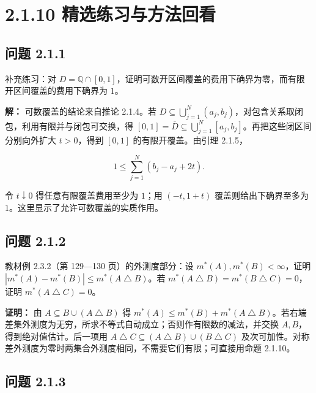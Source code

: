 \documentclass[11pt,a4paper]{article}
\begin{document}
\section[\S{}2.1.10
精选练习与方法回看]{2.1.10
精选练习与方法回看}\label{ux7cbeux9009ux7ec3ux4e60ux4e0eux65b9ux6cd5ux56deux770b}

\subsection{问题 2.1.1}\label{ux95eeux9898-2.1.1}

补充练习：对
\(D=\mathbb Q\cap[0,1]\)，证明可数开区间覆盖的费用下确界为零，而有限开区间覆盖的费用下确界为
\(1\)。

\textbf{解：} 可数覆盖的结论来自推论 2.1.4。若
\(D\subseteq\bigcup_{j=1}^N(a_j,b_j)\)，对包含关系取闭包，利用有限并与闭包可交换，得
\([0,1]=\overline D\subseteq\bigcup_{j=1}^N[a_j,b_j]\)。再把这些闭区间分别向外扩大
\(t>0\)，得到 \([0,1]\) 的有限开覆盖。由引理 2.1.5，

\begin{equation*}
1\le\sum_{j=1}^N(b_j-a_j+2t).
\tag{2.1.23}
\end{equation*}

令 \(t\downarrow0\) 得任意有限覆盖费用至少为 \(1\)；用 \((-t,1+t)\)
覆盖则给出下确界至多为 \(1\)。这里显示了允许可数覆盖的实质作用。

\subsection{问题 2.1.2}\label{ux95eeux9898-2.1.2}

教材例 2.3.2（第 129---130 页）的外测度部分：设
\(m^*(A),m^*(B)<\infty\)，证明
\(|m^*(A)-m^*(B)|\le m^*(A\mathbin{\triangle}B)\)。若
\(m^*(A\mathbin{\triangle}B)=m^*(B\mathbin{\triangle}C)=0\)，证明
\(m^*(A\mathbin{\triangle}C)=0\)。

\textbf{证明：} 由 \(A\subseteq B\cup(A\mathbin{\triangle}B)\) 得
\(m^*(A)\le m^*(B)+m^*(A\mathbin{\triangle}B)\)。若右端差集外测度为无穷，所求不等式自动成立；否则作有限数的减法，并交换
\(A,B\)，得到绝对值估计。后一项用
\(A\mathbin{\triangle}C\subseteq(A\mathbin{\triangle}B)\cup(B\mathbin{\triangle}C)\)
及次可加性。对称差外测度为零时两集合外测度相同，不需要它们有限；可直接用命题
2.1.10。

\subsection{问题 2.1.3}\label{ux95eeux9898-2.1.3}
\end{document}

